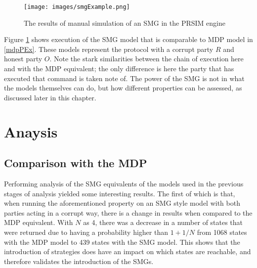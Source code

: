 \documentclass{l4proj}
\begin{document}
\begin{figure}[h!]
\centering
\texttt{[image: images/smgExample.png]}
\caption{The results of manual simulation of an SMG in the PRSIM engine}
\label{smgEx}
\end{figure}

Figure \ref{smgEx} shows execution of the SMG model that is comparable to MDP model in \ref{mdpPEx}. These models represent the protocol with a corrupt party $R$ and honest party $O$. Note the stark similarities between the chain of execution here and with the MDP equivalent; the only difference is here the party that has executed that command is taken note of. The power of the SMG is not in what the models themselves can do, but how different properties can be assessed, as discussed later in this chapter.


\section{Anaysis}

\subsection{Comparison with the MDP}
Performing analysis of the SMG equivalents of the models used in the previous stages of analysis yielded some interesting results. The first of which is that, when running the aforementioned property on an SMG style model with both parties acting in a corrupt way, there is a change in results when compared to the MDP equivalent. With $N$ as 4, there was a decrease in a number of states that were returned due to having a probability higher than $1+1/N$ from 1068 states with the MDP model to 439 states with the SMG model. This shows that the introduction of strategies does have an impact on which states are reachable, and therefore validates the introduction of the SMGs.
\end{document}
